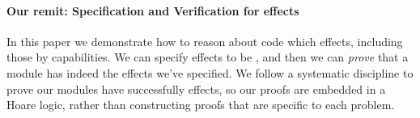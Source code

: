  


\paragraph{Our remit:  Specification and Verification for  \tamed effects}
In this paper we demonstrate how to reason about  code which \tames effects,
{including those \tamed by capabilities.}  
We can specify effects to be \tamed, 
and then we can \emph{prove} that a module has indeed \tamed the effects we've specified.
We follow a systematic discipline to prove our modules have successfully \tamed effects,
so our proofs are embedded in a Hoare logic, rather than constructing proofs that are specific to each problem.

